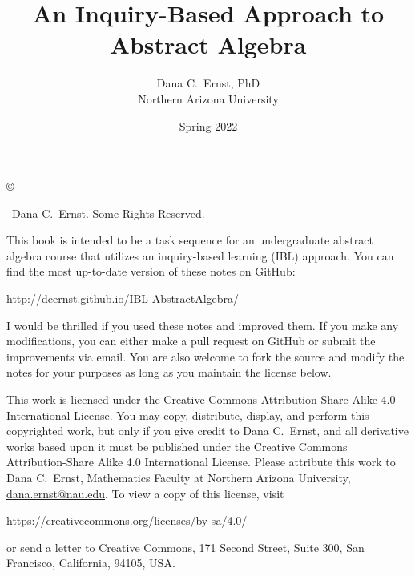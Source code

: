 \documentclass[12pt,oneside]{book}
\theoremstyle{definition}
\begin{document}
\title{An Inquiry-Based Approach to Abstract Algebra}
\author{Dana C.~Ernst, PhD\\
Northern Arizona University}
\date{Spring 2022}

\maketitle

\noindent\copyright{ \the\year\ Dana C.~Ernst.  Some Rights Reserved.\\

\bigskip

\noindent This book is intended to be a task sequence for an undergraduate abstract algebra course that utilizes an inquiry-based learning (IBL) approach.  You can find the most up-to-date version of these notes on GitHub:
\begin{center}
\url{http://dcernst.github.io/IBL-AbstractAlgebra/}
\end{center}
I would be thrilled if you used these notes and improved them. If you make any modifications, you can either make a pull request on GitHub or submit the improvements via email.  You are also welcome to fork the source and modify the notes for your purposes as long as you maintain the license below.

\bigskip

\noindent This work is licensed under the Creative Commons Attribution-Share Alike 4.0 International License.  You may copy, distribute, display, and perform this copyrighted work, but only if you give credit to Dana C.~Ernst, and all derivative works based upon it must be published under the Creative Commons Attribution-Share Alike 4.0 International License. Please attribute this work to Dana C.~Ernst, Mathematics Faculty at Northern Arizona University, \url{dana.ernst@nau.edu}. To view a copy of this license, visit
\begin{center}
\url{https://creativecommons.org/licenses/by-sa/4.0/}
\end{center}
or send a letter to Creative Commons, 171 Second Street, Suite 300, San Francisco, California, 94105, USA.}

\medskip

\begin{center}
\ccbysa
\end{center}

\tableofcontents














\end{document}
